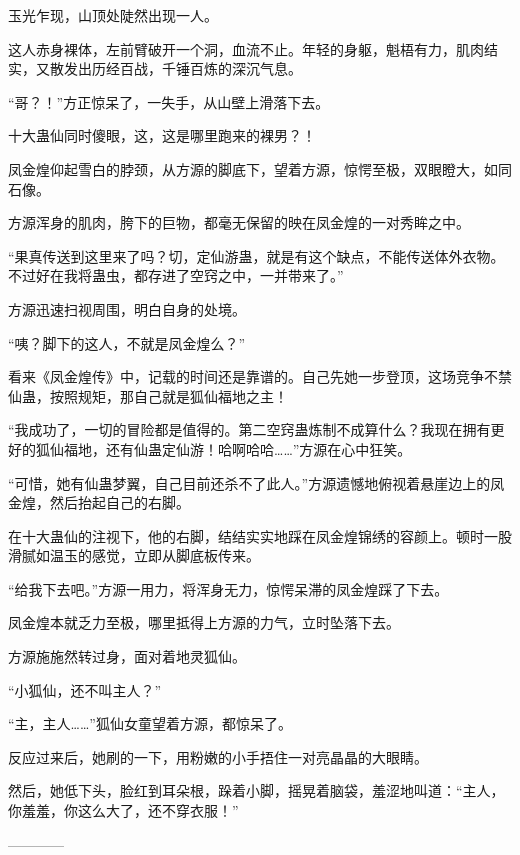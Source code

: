 \begin{this_body}
玉光乍现，山顶处陡然出现一人。

这人赤身裸体，左前臂破开一个洞，血流不止。年轻的身躯，魁梧有力，肌肉结实，又散发出历经百战，千锤百炼的深沉气息。

“哥？！”方正惊呆了，一失手，从山壁上滑落下去。

十大蛊仙同时傻眼，这，这是哪里跑来的裸男？！

凤金煌仰起雪白的脖颈，从方源的脚底下，望着方源，惊愕至极，双眼瞪大，如同石像。

方源浑身的肌肉，胯下的巨物，都毫无保留的映在凤金煌的一对秀眸之中。

“果真传送到这里来了吗？切，定仙游蛊，就是有这个缺点，不能传送体外衣物。不过好在我将蛊虫，都存进了空窍之中，一并带来了。”

方源迅速扫视周围，明白自身的处境。

“咦？脚下的这人，不就是凤金煌么？”

看来《凤金煌传》中，记载的时间还是靠谱的。自己先她一步登顶，这场竞争不禁仙蛊，按照规矩，那自己就是狐仙福地之主！

“我成功了，一切的冒险都是值得的。第二空窍蛊炼制不成算什么？我现在拥有更好的狐仙福地，还有仙蛊定仙游！哈啊哈哈……”方源在心中狂笑。

“可惜，她有仙蛊梦翼，自己目前还杀不了此人。”方源遗憾地俯视着悬崖边上的凤金煌，然后抬起自己的右脚。

在十大蛊仙的注视下，他的右脚，结结实实地踩在凤金煌锦绣的容颜上。顿时一股滑腻如温玉的感觉，立即从脚底板传来。

“给我下去吧。”方源一用力，将浑身无力，惊愕呆滞的凤金煌踩了下去。

凤金煌本就乏力至极，哪里抵得上方源的力气，立时坠落下去。

方源施施然转过身，面对着地灵狐仙。

“小狐仙，还不叫主人？”

“主，主人……”狐仙女童望着方源，都惊呆了。

反应过来后，她刷的一下，用粉嫩的小手捂住一对亮晶晶的大眼睛。

然后，她低下头，脸红到耳朵根，跺着小脚，摇晃着脑袋，羞涩地叫道：“主人，你羞羞，你这么大了，还不穿衣服！”

------------

\end{this_body}

